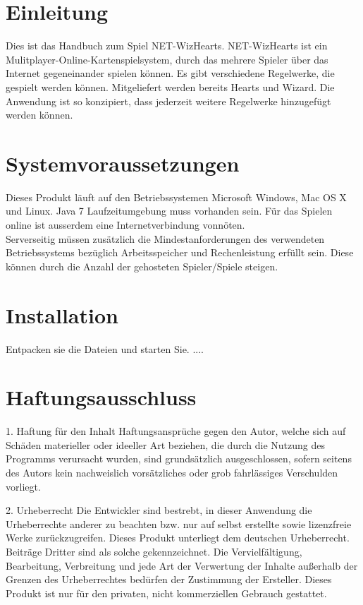 \documentclass[titlepage,10pt,a4paper]{article}
\begin{document}
\newpage
 
\section{Einleitung}
Dies ist das Handbuch zum Spiel NET-WizHearts. NET-WizHearts ist ein Mulitplayer-Online-Kartenspielsystem, durch das mehrere Spieler über das Internet gegeneinander spielen können. Es gibt verschiedene Regelwerke, die gespielt werden können. Mitgeliefert werden bereits Hearts und Wizard. Die Anwendung ist so konzipiert, dass jederzeit weitere \gls{Regelwerk}e hinzugefügt werden können.

\section{Systemvoraussetzungen}
Dieses Produkt läuft auf den Betriebssystemen Microsoft Windows, Mac OS X und Linux. Java 7 Laufzeitumgebung muss vorhanden sein. Für das Spielen online ist ausserdem eine Internetverbindung vonnöten. \\
\gls{Server}seitig müssen zusätzlich die Mindestanforderungen des verwendeten Betriebssystems bezüglich Arbeitsspeicher und Rechenleistung erfüllt sein. Diese können durch die Anzahl der gehosteten Spieler/Spiele steigen.

\section{Installation}
Entpacken sie die Dateien und starten Sie.
....\\
\section{Haftungsausschluss}

1. Haftung für den Inhalt
Haftungsansprüche gegen den Autor, welche sich auf Schäden materieller oder ideeller Art beziehen, die durch die Nutzung des Programms verursacht wurden, sind grundsätzlich ausgeschlossen, sofern seitens des Autors kein nachweislich vorsätzliches oder grob fahrlässiges Verschulden vorliegt.

2. Urheberrecht
Die Entwickler sind bestrebt, in dieser Anwendung die Urheberrechte anderer zu beachten bzw. nur auf selbst erstellte sowie lizenzfreie Werke zurückzugreifen.
Dieses Produkt unterliegt dem deutschen Urheberrecht. Beiträge Dritter sind als solche gekennzeichnet. Die Vervielfältigung, Bearbeitung, Verbreitung und jede Art der Verwertung der Inhalte außerhalb der Grenzen des Urheberrechtes bedürfen der Zustimmung der Ersteller. Dieses Produkt ist  nur für den privaten, nicht kommerziellen Gebrauch gestattet.
\end{document}

